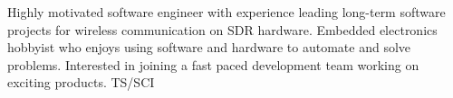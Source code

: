 

\begin{cvparagraph}

Highly motivated software engineer with experience leading long-term software projects for wireless communication on SDR hardware.  Embedded electronics hobbyist who enjoys using software and hardware to automate and solve problems.  Interested in joining a fast paced development team working on exciting products.  TS/SCI
\end{cvparagraph}
